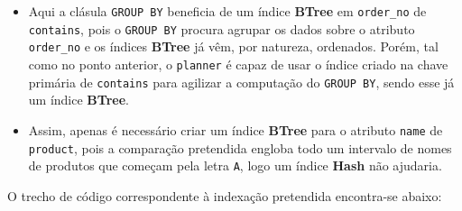\documentclass[12pt,a4paper]{article}
\begin{document}
\vspace*{0.25cm}

\begin{itemize}
  \item Aqui a clásula \texttt{GROUP BY} beneficia de um índice \textbf{BTree} em \texttt{order\_no} de
        \texttt{contains}, pois o \texttt{GROUP BY} procura agrupar os dados sobre o atributo \texttt{order\_no}
        e os índices \textbf{BTree} já vêm, por natureza, ordenados.
        Porém, tal como no ponto anterior, o \texttt{planner} é capaz de usar o índice criado
        na chave primária de \texttt{contains} para agilizar a computação do \texttt{GROUP BY}, sendo
        esse já um índice \textbf{BTree}.

  \item Assim, apenas é necessário criar um índice \textbf{BTree} para o atributo \texttt{name}
        de \texttt{product}, pois a comparação pretendida engloba todo um intervalo de nomes
        de produtos que começam pela letra \texttt{A}, logo um índice \textbf{Hash} não ajudaria.
\end{itemize}

O trecho de código correspondente à indexação pretendida encontra-se abaixo:


\end{document}
